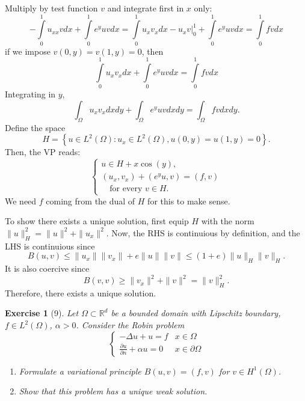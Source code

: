 \documentclass[letterpaper,twoside,11pt]{article}
\theoremstyle{mystyle}
\newtheorem*{exercise}{Exercise}
\newcommand{\R}{{\mathbb R}}
\begin{document}
Multiply by test function $v$ and integrate first in $x$ only: 
\[-\int\limits_0^1 u_{xx} v dx + \int\limits_0^1 e^y u v dx =\int\limits_0^1 u_{x} v_x  dx - u_xv|_0^1  + \int\limits_0^1 e^y u v dx= \int\limits_0^1 f vdx\]
if we impose $v(0, y) = v(1, y) = 0$, then 
\[\int\limits_0^1 u_{x} v_x  dx + \int\limits_0^1 e^y u v dx = \int\limits_0^1 fv dx\]
Integrating in $y$, 
\[\int_\Omega u_xv_x dx dy + \int_\Omega e^y u v dx dy= \int_\Omega f vdx dy. \]
Define the space 
\[H = \left\{ u \in L^2 (\Omega) : u_x \in L^2 (\Omega), u\left( 0, y \right) = u\left( 1, y \right) = 0\right\}.\] 
Then, the VP reads: 
\[\left\{ {\begin{array}{*{20}{l}}
  {u \in H+x\cos(y),} \\[.2cm] 
  \left( u_x, v_x \right) + \left( e^y u, v \right) = \left( f, v \right) \\[.2cm]
  \quad \text{for every } v\in H.
\end{array}} \right.\]
We need $f$ coming from the dual of $H$ for this to make sense. 

To show there exists a unique solution, first equip $H$ with the norm $\|u\|_H^2 = \|u\|^2 + \|u_x\|^2$. Now, the RHS is continuious by definition, and the LHS is continuious since 
\[B(u,v) \leq \|u_x\| \|v_x\| + e \|u\|\|v\| \leq \left( 1+e \right)\|u\|_H \|v\|_H.\]
It is also coercive since 
\[B\left( v,v \right) \geq \|v_x\|^2 + \|v\|^2 = \|v\|_H^2.\]
Therefore, there exists a unique solution. 


\begin{exercise}[9]
Let $\Omega\subset \R^d$ be a bounded domain with Lipschitz boundary, $f \in L^2 \left( \Omega \right)$, $\alpha > 0$. Consider the Robin problem
\[\left\{ {\begin{array}{*{20}{c}}
  { -\Delta u + u = f}&{x\in \Omega} \\[.2cm] 
  {\displaystyle \frac{\partial u}{\partial n }+ \alpha u = 0}&{x \in \partial \Omega} 
\end{array}} \right.\]
\begin{enumerate}
  \item Formulate a variational principle $B(u,v) = (f, v)$ for $v \in H^1 \left( \Omega \right)$. 
  \item Show that this problem has a unique weak solution. 
\end{enumerate}
\end{exercise}
\end{document}
